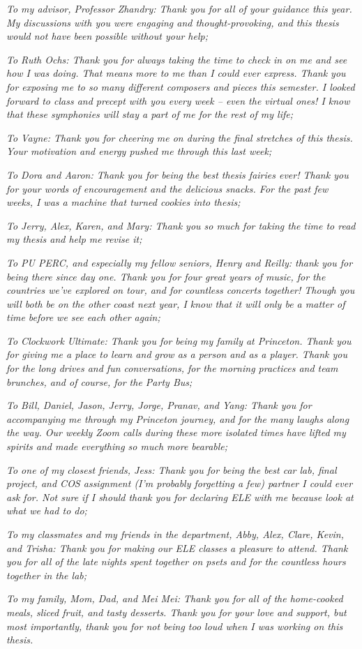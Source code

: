 \textit{To my advisor, Professor Zhandry: Thank you for all of your guidance this year. My discussions with you were engaging and thought-provoking, and this thesis would not have been possible without your help;}

\textit{To Ruth Ochs: Thank you for always taking the time to check in on me and see how I was doing. That means more to me than I could ever express. Thank you for exposing me to so many different composers and pieces this semester. I looked forward to class and precept with you every week -- even the virtual ones! I know that these symphonies will stay a part of me for the rest of my life;}

\textit{To Vayne: Thank you for cheering me on during the final stretches of this thesis. Your motivation and energy pushed me through this last week;}

\textit{To Dora and Aaron: Thank you for being the best thesis fairies ever! Thank you for your words of encouragement and the delicious snacks. For the past few weeks, I was a machine that turned cookies into thesis;}

\textit{To Jerry, Alex, Karen, and Mary: Thank you so much for taking the time to read my thesis and help me revise it;}

\textit{To PU PERC, and especially my fellow seniors, Henry and Reilly: thank you for being there since day one. Thank you for four great years of music, for the countries we've explored on tour, and for countless concerts together! Though you will both be on the other coast next year, I know that it will only be a matter of time before we see each other again;}

\textit{To Clockwork Ultimate: Thank you for being my family at Princeton. Thank you for giving me a place to learn and grow as a person and as a player. Thank you for the long drives and fun conversations, for the morning practices and team brunches, and of course, for the Party Bus;}

\textit{To Bill, Daniel, Jason, Jerry, Jorge, Pranav, and Yang: Thank you for accompanying me through my Princeton journey, and for the many laughs along the way. Our weekly Zoom calls during these more isolated times have lifted my spirits and made everything so much more bearable;}

\textit{To one of my closest friends, Jess: Thank you for being the best car lab, final project, and COS assignment (I'm probably forgetting a few) partner I could ever ask for. Not sure if I should thank you for declaring ELE with me because look at what we had to do;}

\textit{To my classmates and my friends in the department, Abby, Alex, Clare, Kevin, and Trisha: Thank you for making our ELE classes a pleasure to attend. Thank you for all of the late nights spent together on psets and for the countless hours together in the lab;}

\textit{To my family, Mom, Dad, and Mei Mei: Thank you for all of the home-cooked meals, sliced fruit, and tasty desserts. Thank you for your love and support, but most importantly, thank you for not being too loud when I was working on this thesis.}